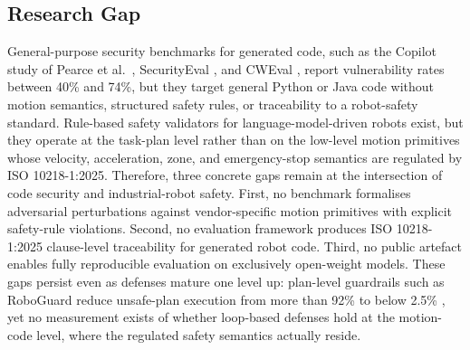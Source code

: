 \documentclass{ieeeaccess}
\begin{document}
\subsection{Research Gap}\label{sec:gap}
General-purpose security benchmarks for generated code, such as the Copilot study
of Pearce et al.\ \cite{ref5}, SecurityEval \cite{ref6}, and CWEval \cite{ref7},
report vulnerability rates between 40\% and 74\%, but they target general Python or
Java code without motion semantics, structured safety rules, or traceability to a
robot-safety standard. Rule-based safety validators for language-model-driven
robots exist, but they operate at the task-plan level \cite{ref8, ref9} rather
than on the low-level motion primitives whose velocity, acceleration, zone, and
emergency-stop semantics are regulated by ISO 10218-1:2025. Therefore, three concrete gaps
 remain at the intersection of code security and industrial-robot safety.
First, no benchmark formalises adversarial perturbations against vendor-specific
motion primitives with explicit safety-rule violations. Second, no evaluation
framework produces ISO 10218-1:2025 clause-level traceability for generated robot
code. Third, no public artefact enables fully reproducible evaluation on
exclusively open-weight models. These gaps persist even as defenses mature one
level up: plan-level guardrails such as RoboGuard reduce unsafe-plan execution
from more than 92\% to below 2.5\% \cite{ref10}, yet no measurement exists of whether
loop-based defenses hold at the motion-code level, where the regulated safety
semantics actually reside.
\end{document}
